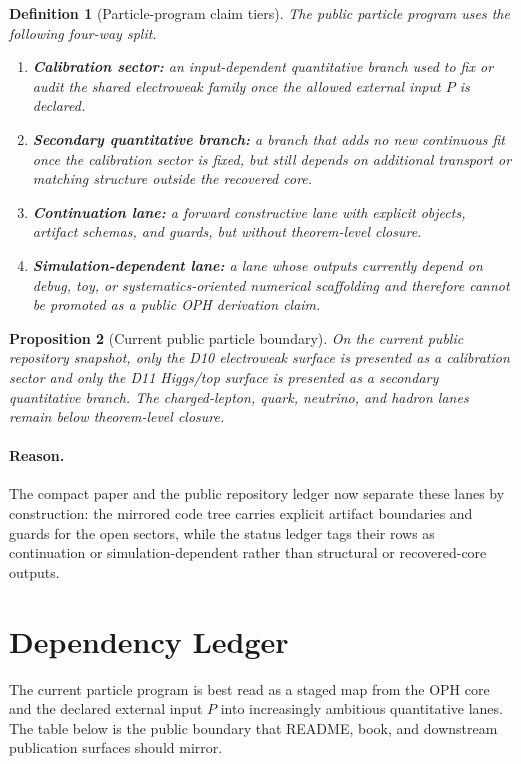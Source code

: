 \documentclass[11pt]{article}
\newtheorem{proposition}{Proposition}[section]
\newtheorem{definition}[proposition]{Definition}
\begin{document}
\begin{definition}[Particle-program claim tiers]
The public particle program uses the following four-way split.
\begin{enumerate}[leftmargin=2em]
\item \textbf{Calibration sector:} an input-dependent quantitative branch used to
fix or audit the shared electroweak family once the allowed external input
\(P\) is declared.
\item \textbf{Secondary quantitative branch:} a branch that adds no new
continuous fit once the calibration sector is fixed, but still depends on
additional transport or matching structure outside the recovered core.
\item \textbf{Continuation lane:} a forward constructive lane with explicit
objects, artifact schemas, and guards, but without theorem-level closure.
\item \textbf{Simulation-dependent lane:} a lane whose outputs currently depend
on debug, toy, or systematics-oriented numerical scaffolding and therefore
cannot be promoted as a public OPH derivation claim.
\end{enumerate}
\end{definition}

\begin{proposition}[Current public particle boundary]
On the current public repository snapshot, only the D10 electroweak surface is
presented as a calibration sector and only the D11 Higgs/top surface is
presented as a secondary quantitative branch. The charged-lepton, quark,
neutrino, and hadron lanes remain below theorem-level closure.
\end{proposition}

\paragraph{Reason.}
The compact paper and the public repository ledger now separate these lanes by
construction: the mirrored code tree carries explicit artifact boundaries and
guards for the open sectors, while the status ledger tags their rows as
continuation or simulation-dependent rather than structural or recovered-core
outputs.

\section{Dependency Ledger}

The current particle program is best read as a staged map from the OPH core and
the declared external input \(P\) into increasingly ambitious quantitative
lanes. The table below is the public boundary that README, book, and downstream
publication surfaces should mirror.
\end{document}
